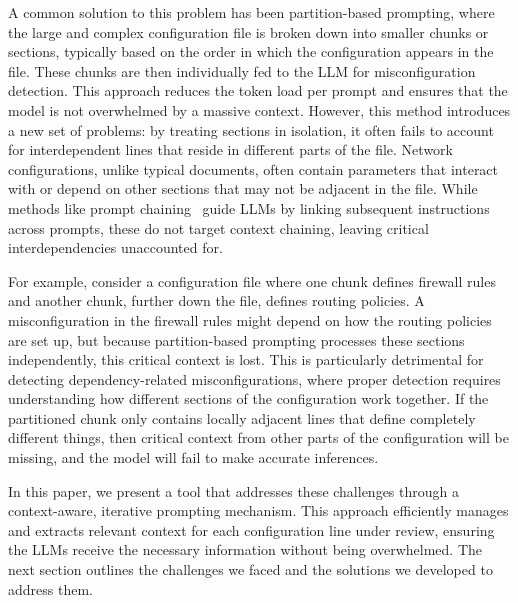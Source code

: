 A common solution to this problem has been partition-based prompting, where the large and complex configuration file is broken down into smaller chunks or sections, typically based on the order in which the configuration appears in the file. These chunks are then individually fed to the LLM for misconfiguration detection. This approach reduces the token load per prompt and ensures that the model is not overwhelmed by a massive context. However, this method introduces a new set of problems: by treating sections in isolation, it often fails to account for interdependent lines that reside in different parts of the file. Network configurations, unlike typical documents, often contain parameters that interact with or depend on other sections that may not be adjacent in the file. While methods like prompt chaining~\cite{wang2024identifying,bogdanov2024leveraging} guide LLMs by linking subsequent instructions across prompts, these do not target context chaining, leaving critical interdependencies unaccounted for.

For example, consider a configuration file where one chunk defines firewall rules and another chunk, further down the file, defines routing policies. A misconfiguration in the firewall rules might depend on how the routing policies are set up, but because partition-based prompting processes these sections independently, this critical context is lost. This is particularly detrimental for detecting dependency-related misconfigurations, where proper detection requires understanding how different sections of the configuration work together. If the partitioned chunk only contains locally adjacent lines that define completely different things, then critical context from other parts of the configuration will be missing, and the model will fail to make accurate inferences.


In this paper, we present a tool that addresses these challenges through a context-aware, iterative prompting mechanism. This approach efficiently manages and extracts relevant context for each configuration line under review, ensuring the LLMs receive the necessary information without being overwhelmed. The next section outlines the challenges we faced and the solutions we developed to address them.